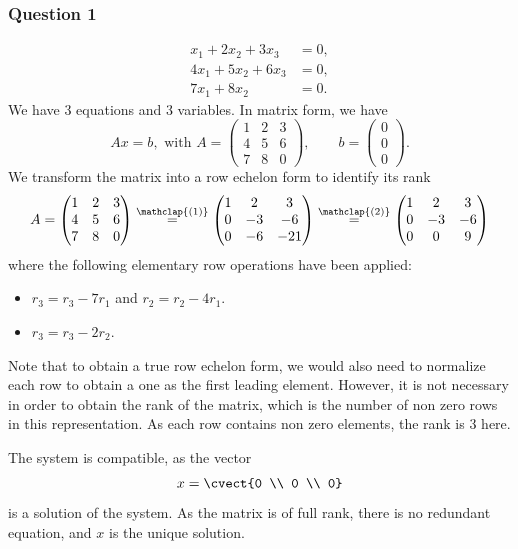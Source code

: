 \subsubsection*{Question 1}
\begin{align*}
x_1+2x_2+3x_3 & = 0,\\
4x_1+5x_2+6x_3 & = 0,\\
7x_1+8x_2& =0.
\end{align*}
We have 3 equations and 3 variables. In matrix form, we have
\[
Ax = b, \text{ with } A= \begin{pmatrix}
1&2&3\\ 4&5&6\\ 7&8&0
\end{pmatrix}, \qquad b = \begin{pmatrix}
0\\0\\0
\end{pmatrix}.
\]
We transform the matrix into a row echelon form to identify its rank
\[
A=
\begin{pmatrix}
  1 & 2 & 3 \\ 4 & 5 & 6 \\ 7 & 8 & 0 
\end{pmatrix}
\stackrel{\mathclap{(1)}}{=}
\begin{pmatrix}
  1 & 2 & 3 \\ 0 & -3 & -6 \\ 0 & -6 & -21 
\end{pmatrix}
\stackrel{\mathclap{(2)}}{=}
\begin{pmatrix}
  1 & 2 & 3 \\ 0 & -3 & -6 \\ 0 & 0 & 9 
\end{pmatrix}
\]
where the following elementary row operations have been applied:
\begin{itemize}
\item[(1)] $r_3 = r_3 - 7r_1$ and $r_2=r_2-4r_1$.
\item[(2)] $r_3 = r_3 -2 r_2$.
\end{itemize}
Note that to obtain a true row echelon form, we would also need to normalize
each row to obtain a one as the first leading element. However, it is
not necessary in order to obtain the rank of the matrix, which is the number of
non zero rows in this representation. As each row contains non
zero elements, the rank is 3 here.

The system is compatible, as the vector
\[
x=\cvect{0 \\ 0 \\ 0}
\]
is a solution of the system. As the matrix is of full rank, there is
no redundant equation, and $x$ is the unique solution.


